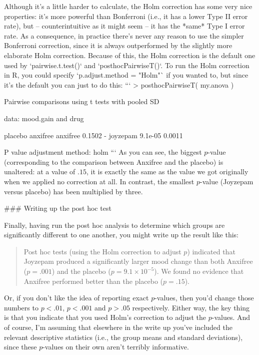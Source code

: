 Although it's a little harder to calculate, the Holm correction has some very nice properties: it's more powerful than Bonferroni (i.e., it has a lower Type II error rate), but -- counterintuitive as it might seem -- it has the *same* Type I error rate. As a consequence, in practice there's never any reason to use the simpler Bonferroni correction, since it is always outperformed by the slightly more elaborate Holm correction. Because of this, the Holm correction is the default one used by `pairwise.t.test()` and `posthocPairwiseT()`. To run the Holm correction in R, you could specify `p.adjust.method = "Holm"` if you wanted to, but since it's the default you can just to do this:
```
> posthocPairwiseT( my.anova )

	Pairwise comparisons using t tests with pooled SD 

data:  mood.gain and drug 

         placebo anxifree
anxifree 0.1502  -       
joyzepam 9.1e-05 0.0011  

P value adjustment method: holm 
```
As you can see, the biggest $p$-value (corresponding to the comparison between Anxifree and the placebo) is unaltered: at a value of $.15$, it is exactly the same as the value we got originally when we applied no correction at all. In contrast, the smallest $p$-value (Joyzepam versus placebo) has been multiplied by three. 



### Writing up the post hoc test

Finally, having run the post hoc analysis to determine which groups are significantly different to one another, you might write up the result like this:
\begin{quote}
Post hoc tests (using the Holm correction to adjust $p$) indicated that Joyzepam produced a significantly larger mood change than both Anxifree ($p = .001$) and the placebo ($p = 9.1 \times 10^{-5}$). We found no evidence that Anxifree performed better than the placebo ($p = .15$).
\end{quote}
Or, if you don't like the idea of reporting exact $p$-values, then you'd change those numbers to $p<.01$, $p<.001$ and $p > .05$ respectively. Either way, the key thing is that you indicate that you used Holm's correction to adjust the $p$-values. And of course, I'm assuming that elsewhere in the write up you've included the relevant descriptive statistics (i.e., the group means and standard deviations), since these $p$-values on their own aren't terribly informative. 




